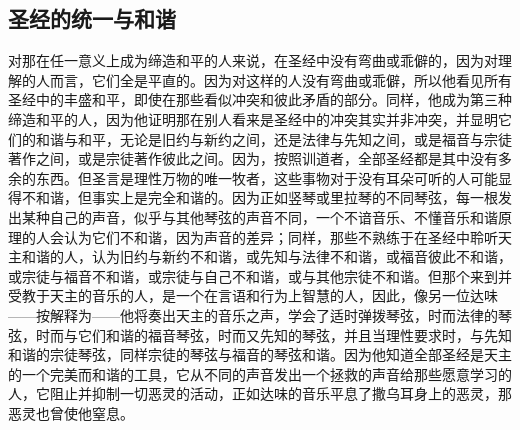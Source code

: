 
\subsection{圣经的统一与和谐}

对那在任一意义上成为缔造和平的人来说，在圣经中没有弯曲或乖僻的，因为对理解的人而言，它们全是平直的。因为对这样的人没有弯曲或乖僻，所以他看见所有圣经中的丰盛和平，即使在那些看似冲突和彼此矛盾的部分。同样，他成为第三种缔造和平的人，因为他证明那在别人看来是圣经中的冲突其实并非冲突，并显明它们的和谐与和平，无论是旧约与新约之间，还是法律与先知之间，或是福音与宗徒著作之间，或是宗徒著作彼此之间。因为，按照训道者，全部圣经都是其中没有多余的东西。但圣言是理性万物的唯一牧者，这些事物对于没有耳朵可听的人可能显得不和谐，但事实上是完全和谐的。因为正如竖琴或里拉琴的不同琴弦，每一根发出某种自己的声音，似乎与其他琴弦的声音不同，一个不谙音乐、不懂音乐和谐原理的人会认为它们不和谐，因为声音的差异；同样，那些不熟练于在圣经中聆听天主和谐的人，认为旧约与新约不和谐，或先知与法律不和谐，或福音彼此不和谐，或宗徒与福音不和谐，或宗徒与自己不和谐，或与其他宗徒不和谐。但那个来到并受教于天主的音乐的人，是一个在言语和行为上智慧的人，因此，像另一位达味——按解释为——他将奏出天主的音乐之声，学会了适时弹拨琴弦，时而法律的琴弦，时而与它们和谐的福音琴弦，时而又先知的琴弦，并且当理性要求时，与先知和谐的宗徒琴弦，同样宗徒的琴弦与福音的琴弦和谐。因为他知道全部圣经是天主的一个完美而和谐的工具，它从不同的声音发出一个拯救的声音给那些愿意学习的人，它阻止并抑制一切恶灵的活动，正如达味的音乐平息了撒乌耳身上的恶灵，那恶灵也曾使他窒息。\par



\section{}


